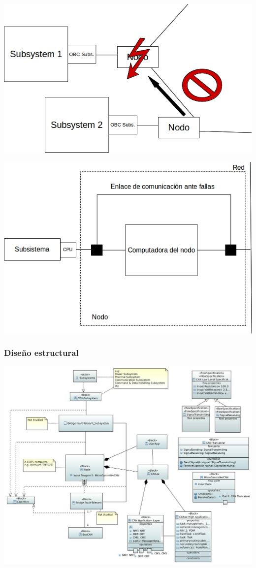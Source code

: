 \begin{frame}[c]
	\centering
	\includegraphics[scale=0.4]{images/Bridge2.jpg}
\end{frame}

\begin{frame}[c]
	\centering
	\includegraphics[scale=0.4]{images/com_nodo.jpg}
\end{frame}

\begin{frame}[c]
	\frametitle{Diseño estructural}
	\centering
	\includegraphics[scale=0.4]{images/ArqCompletaBlockDiagram.JPG}
\end{frame}

